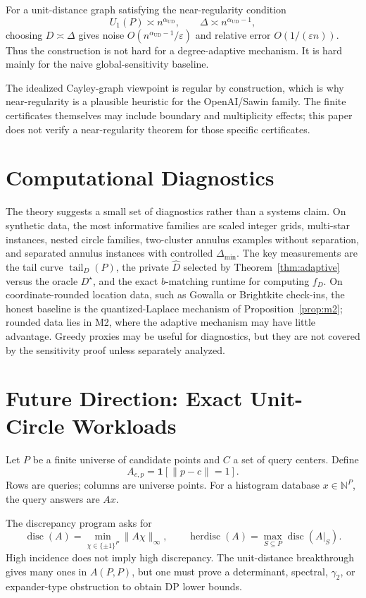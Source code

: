 \documentclass[11pt]{article}
\DeclareMathOperator{\disc}{disc}
\DeclareMathOperator{\herdisc}{herdisc}
\newcommand{\eps}{\varepsilon}
\newcommand{\tail}{\operatorname{tail}}
\begin{document}
For a unit-distance graph satisfying the near-regularity condition
\[
U_1(P)\asymp n^{\alpha_{\mathrm{UD}}},\qquad
\Delta\asymp n^{\alpha_{\mathrm{UD}}-1},
\]
choosing \(D\asymp \Delta\) gives noise \(O(n^{\alpha_{\mathrm{UD}}-1}/\eps)\) and relative error \(O(1/(\eps n))\). Thus the construction is not hard for a degree-adaptive mechanism. It is hard mainly for the naive global-sensitivity baseline.

The idealized Cayley-graph viewpoint is regular by construction, which is why near-regularity is a plausible heuristic for the OpenAI/Sawin family. The finite certificates themselves may include boundary and multiplicity effects; this paper does not verify a near-regularity theorem for those specific certificates.

\section{Computational Diagnostics}

The theory suggests a small set of diagnostics rather than a systems claim. On synthetic data, the most informative families are scaled integer grids, multi-star instances, nested circle families, two-cluster annulus examples without separation, and separated annulus instances with controlled \(\Delta_{\min}\). The key measurements are the tail curve \(\tail_D(P)\), the private \(\widehat D\) selected by Theorem~\ref{thm:adaptive} versus the oracle \(D^\star\), and the exact \(b\)-matching runtime for computing \(f_D\). On coordinate-rounded location data, such as Gowalla or Brightkite check-ins, the honest baseline is the quantized-Laplace mechanism of Proposition~\ref{prop:m2}; rounded data lies in M2, where the adaptive mechanism may have little advantage. Greedy proxies may be useful for diagnostics, but they are not covered by the sensitivity proof unless separately analyzed.

\appendix
\section{Future Direction: Exact Unit-Circle Workloads}
\label{app:route2}

Let \(P\) be a finite universe of candidate points and \(C\) a set of query centers. Define
\[
A_{c,p}=\mathbf{1}[\|p-c\|=1].
\]
Rows are queries; columns are universe points. For a histogram database \(x\in \mathbb{N}^P\), the query answers are \(Ax\).

The discrepancy program asks for
\[
\disc(A)=\min_{\chi\in\{\pm1\}^P}\|A\chi\|_\infty,\qquad
\herdisc(A)=\max_{S\subseteq P}\disc(A|_S).
\]
High incidence does not imply high discrepancy. The unit-distance breakthrough gives many ones in \(A(P,P)\), but one must prove a determinant, spectral, \(\gamma_2\), or expander-type obstruction to obtain DP lower bounds.
\end{document}
